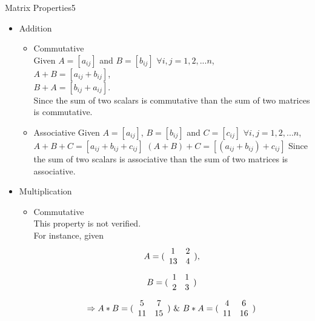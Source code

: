 \begin{questions}
\begin{question}{Matrix Properties}{5}
\begin{answer}
	\begin{itemize}
		\item Addition
			\begin{itemize}
				\item Commutative \\
				Given $ A = [ a_{ij} ]$ and $ B = [ b_{ij} ]$ $\forall i, j =  {1,2,...n}$, \\
				$A + B = [a_{ij} +b_{ij}] $, \\
				$B + A = [b_{ij} +a_{ij}] $. \\ 
				Since the sum of two scalars is commutative than the sum of two matrices is commutative.
				\item Associative
				Given $ A = [ a_{ij} ]$, $ B = [ b_{ij} ]$ and $ C = [ c_{ij} ]$ $\forall i, j =  {1,2,...n}$, \\
				$A + B + C = [ a_{ij} + b_{ij} + c_{ij} ]$ 
				$(A+B) + C = [ (a_{ij} + b_{ij}) + c_{ij} ]$
				Since the sum of two scalars is associative than the sum of two matrices is associative.
			\end{itemize}
		\item Multiplication
		 	\begin{itemize}
		 		\item Commutative \\
		 		This property is not verified. \\
		 		For instance, given \\
		 		\begin{equation*}
		 		A = ( \begin{array}{c c } 
		 		1 & 2  \\
		 		13& 4 \end{array} ),
		 		\end{equation*}
		 		\begin{equation*}
		 		B = ( \begin{array}{c c } 
		 		1 & 1  \\
		 		2& 3 \end{array} )
		 		\end{equation*}
		 		\begin{equation*}
		 		\Rightarrow 
		 		A*B = ( \begin{array}{c c } 
		 		5& 7  \\
		 		11& 15 \end{array} ) \ \&  \
		 		B*A = ( \begin{array}{c c } 
		 		4& 6  \\
		 		11& 16 \end{array} )

\end{equation*}
\end{itemize}
\end{itemize}
\end{answer}
\end{question}
\end{questions}
